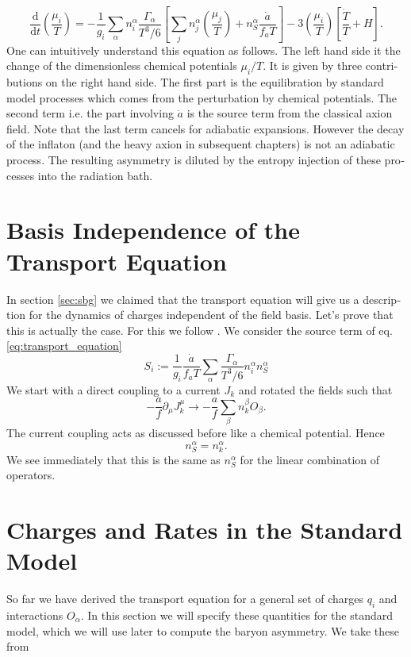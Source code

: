 \documentclass[master,       %
               twoside,        %
               BCOR10mm,       %
               english,ngerman, %
               ]{GAUBM}
\begin{document}
\begin{otherlanguage}{english}
\begin{equation}
	\label{eq:transport_equation}
	\boxed{
	\frac{\mathrm{d}}{\mathrm{d} t} \left( \frac{\mu_i}{T} \right) = - \frac{1}{g_i} \sum_\alpha n^\alpha_i \frac{\Gamma_\alpha}{T^3 / 6} \left[ \sum_j n_j^\alpha \left( \frac{\mu_j}{T} \right) + n_S^\alpha \frac{\dot{a}}{f_a T} \right] - 3 \left( \frac{\mu_i}{T} \right) \left[ \frac{\dot{T}}{T} + H \right].
	}
\end{equation}
One can intuitively understand this equation as follows.
The left hand side it the change of the dimensionless chemical potentials $\mu_i / T$. It is given by three contributions on the right hand side.
The first part is the equilibration by standard model processes which comes from the perturbation by chemical potentials. 
The second term i.e. the part involving $\dot{a}$ is the source term from the classical axion field.  
Note that the last term cancels for adiabatic expansions. However the decay of the inflaton (and the heavy axion in subsequent chapters) is not an adiabatic process. The resulting asymmetry is diluted by the entropy injection of these processes into the radiation bath.


\section{Basis Independence of the Transport Equation}

In section \ref{sec:sbg} we claimed that the transport equation will give us a description for the dynamics of charges independent of the field basis.
Let's prove that this is actually the case.
For this we follow \cite[sec. 2.2 ]{Domcke:2020kcp_Generic_Couplings}.
We consider the source term of eq. \eqref{eq:transport_equation}
\begin{equation}
	S_i := \frac{1}{g_i} \frac{\dot{a}}{f_a T} \sum_\alpha \frac{\Gamma_\alpha}{T^3 / 6} n_i^\alpha n_S^\alpha
\end{equation}
We start with a direct coupling to a current $J_k$ and rotated the fields such that
\begin{equation}
	- \frac{a}{f} \partial_\mu J^\mu_k \to - \frac{a}{f} \sum_\beta n_k^\beta O_\beta.
\end{equation}
The current coupling acts as discussed before like a chemical potential. Hence
\begin{equation}
	n_S^\alpha = n_k^\alpha.
\end{equation}
We see immediately that this is the same as $n_S^\alpha$ for the linear combination of operators.


\section{Charges and Rates in the Standard Model}
\label{sec:charges_and_rates_in_the_standard_model}
So far we have derived the transport equation for a general set of charges $q_i$ and interactions $O_\alpha$. In this section we will specify these quantities for the standard model, which we will use later to compute the baryon asymmetry.
We take these from \cite[sec. 3.1]{Domcke:2020kcp_Generic_Couplings}


\end{otherlanguage}
\end{document}
